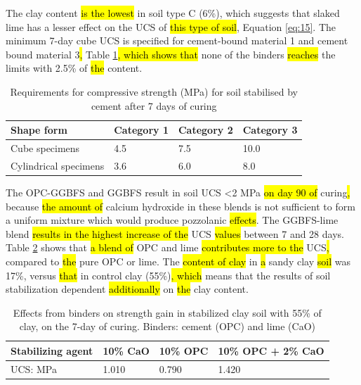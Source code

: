 \documentclass[electronics,article,submit,pdftex,moreauthors]{Definitions/mdpi}
\begin{document}
The clay content \hl{is the lowest} in soil type C\hl{ }(6\%), which suggests that slaked lime has a lesser effect on the UCS of \hl{this type of soil}, Equation \ref{eq:15}. The minimum 7-day cube UCS is specified for cement-bound material 1\hl{ }and cement bound material 3\hl{, }Table \ref{tab:4}\hl{, which shows that }none of the binders \hl{reaches} the limits\hl{ }with 2.5\% of \hl{the} content. 
 
\begin{table}[H]
\caption{Requirements for compressive strength (MPa) for soil stabilised by cement after 7 days of curing}
\small
    \begin{tabularx}{\textwidth}{|l|l|l|l}
    \toprule
         \textbf{Shape form} & \textbf{Category 1} & \textbf{Category 2} & \textbf{Category 3} \\ 
         \midrule
        Cube specimens & 4.5 & 7.5 & 10.0 \\ \hline
        Cylindrical specimens & 3.6 & 6.0 & 8.0 \\ 
        \bottomrule
    \end{tabularx} \label{tab:4}
\end{table}
 
 The OPC-GGBFS and GGBFS result in soil UCS <2 MPa \hl{on day 90 of }curing\hl{, }because\hl{ the amount of }calcium hydroxide in these blends is not sufficient to form a uniform mixture which would produce pozzolanic \hl{effects}. The GGBFS-lime blend \hl{results in the highest increase of the} UCS \hl{values }between 7 and 28 days. Table \ref{tab:5} shows that \hl{a blend of} OPC and lime \hl{contributes more to the} UCS\hl{, }compared to \hl{the} pure OPC or lime. The \hl{content of clay} in \hl{a} sandy clay \hl{soil} was 17\%, versus \hl{that} in control clay (55\%)\hl{, which }means that the results of soil stabilization\hl{ }dependent\hl{ additionally }on \hl{the} clay content.
 
\begin{table}[H]
\caption{Effects from binders on strength gain in stabilized clay soil with 55\% of clay, on the 7-day of curing. Binders: cement (OPC) and lime (CaO)}
\small
    \begin{tabularx}{\textwidth}{|l|l|l|l|}
    \toprule
        \textbf{Stabilizing agent} & \textbf{10\% CaO} & \textbf{10\% OPC} & \textbf{10\% OPC + 2\% CaO} \\ 
        \midrule
        UCS: MPa & 1.010 & 0.790 & 1.420 \\ 
        \bottomrule
    \end{tabularx}\label{tab:5}
\end{table}
\end{document}
